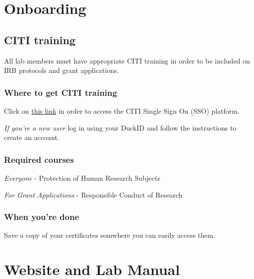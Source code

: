 \documentclass[]{book}
\begin{document}
\hypertarget{onboarding}{%
\chapter{Onboarding}\label{onboarding}}

\hypertarget{citi-training}{%
\section{CITI training}\label{citi-training}}

All lab members must have appropriate CITI training in order to be included on IRB protocols and grant applications.

\hypertarget{where-to-get-citi-training}{%
\subsection{Where to get CITI training}\label{where-to-get-citi-training}}

Click on \href{https://www.citiprogram.org/Shibboleth.sso/Login?target=https\%3A\%2F\%2Fwww.citiprogram.org\%2FSecure\%2FWelcome.cfm\%3finst\%3d1831\&entityID=https\%3A\%2F\%2Fshibboleth.uoregon.edu\%2Fidp\%2Fshibboleth}{this link} in order to access the CITI Single Sign On (SSO) platform.

\emph{If you're a new user} log in using your DuckID and follow the instructions to create an account.

\hypertarget{required-courses}{%
\subsection{Required courses}\label{required-courses}}

\emph{Everyone}
- Protection of Human Research Subjects

\emph{For Grant Applications}
- Responsible Conduct of Research

\hypertarget{when-youre-done}{%
\subsection{When you're done}\label{when-youre-done}}

Save a copy of your certificates somwhere you can easily access them.

\hypertarget{website-and-lab-manual}{%
\chapter{Website and Lab Manual}\label{website-and-lab-manual}}
\end{document}

